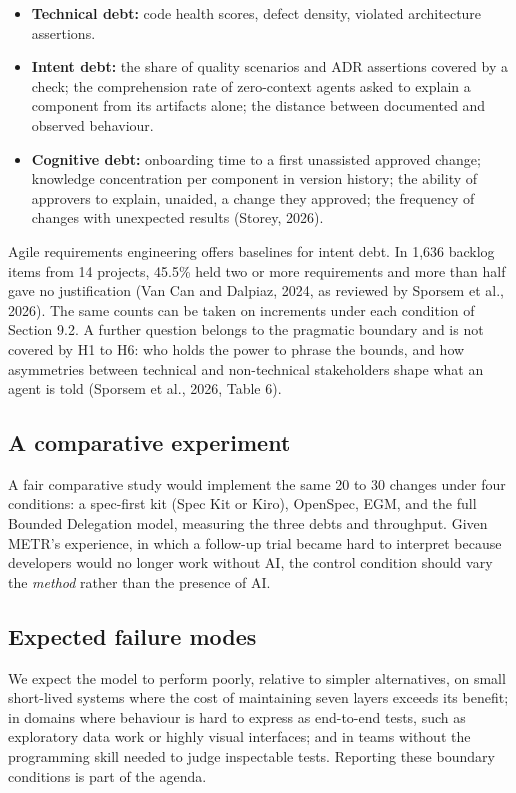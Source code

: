 \documentclass[11pt]{article}
\begin{document}
\begin{itemize}[leftmargin=*]
  \item \textbf{Technical debt:} code health scores, defect density, violated architecture assertions.
  \item \textbf{Intent debt:} the share of quality scenarios and ADR assertions covered by a check; the comprehension rate of zero-context agents asked to explain a component from its artifacts alone; the distance between documented and observed behaviour.
  \item \textbf{Cognitive debt:} onboarding time to a first unassisted approved change; knowledge concentration per component in version history; the ability of approvers to explain, unaided, a change they approved; the frequency of changes with unexpected results (Storey, 2026).
\end{itemize}

Agile requirements engineering offers baselines for intent debt. In 1,636 backlog items from 14 projects, 45.5\% held two or more requirements and more than half gave no justification (Van Can and Dalpiaz, 2024, as reviewed by Sporsem et al., 2026). The same counts can be taken on increments under each condition of Section 9.2. A further question belongs to the pragmatic boundary and is not covered by H1 to H6: who holds the power to phrase the bounds, and how asymmetries between technical and non-technical stakeholders shape what an agent is told (Sporsem et al., 2026, Table 6).

\subsection{A comparative experiment}

A fair comparative study would implement the same 20 to 30 changes under four conditions: a spec-first kit (Spec Kit or Kiro), OpenSpec, EGM, and the full Bounded Delegation model, measuring the three debts and throughput. Given METR's experience, in which a follow-up trial became hard to interpret because developers would no longer work without AI, the control condition should vary the \emph{method} rather than the presence of AI.

\subsection{Expected failure modes}

We expect the model to perform poorly, relative to simpler alternatives, on small short-lived systems where the cost of maintaining seven layers exceeds its benefit; in domains where behaviour is hard to express as end-to-end tests, such as exploratory data work or highly visual interfaces; and in teams without the programming skill needed to judge inspectable tests. Reporting these boundary conditions is part of the agenda.
\end{document}
